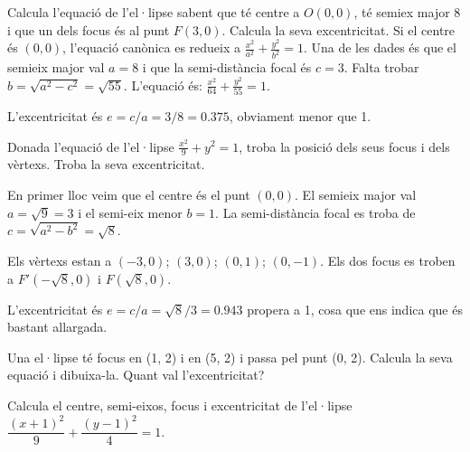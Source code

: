 \documentclass[11pt, a4paper, pdf]{article}
\begin{document}
\begin{resolt}[E]{Calcula l'equació de l'el·lipse sabent que té centre a $O(0,0)$, té semiex major 8 i que un dels focus és al punt $F(3,0)$. Calcula la seva excentricitat. }
	Si el centre és $(0,0)$, l'equació canònica es redueix a $\frac{x^2}{a^2}+\frac{y^2}{b^2}=1$. Una de les dades és que el semieix major val $a=8$ i que la semi-distància focal és $c=3$. Falta trobar $b=\sqrt{a^2-c^2}=\sqrt{55}$. L'equació és: $\frac{x^2}{64}+\frac{y^2}{55}=1$.
	
	L'excentricitat és $e=c/a = 3/8 = 0.375 $, obviament menor que 1.
	
\end{resolt}
\vspace{-0.75cm}
\begin{resolt}{Donada l'equació de l'el·lipse  $\frac{x^2}{9}+y^2=1$, troba la posició dels seus focus i dels vèrtexs. Troba la seva excentricitat. }
	
	
	En primer lloc veim que el centre és el punt $(0,0)$. El semieix major val $a=\sqrt{9}=3$ i el semi-eix menor $b=1$. La semi-distància focal es troba de $c=\sqrt{a^2-b^2}=\sqrt{8}$. 
	
	Els vèrtexs estan a $(-3,0)$; $(3,0)$; $(0,1)$; $(0,-1)$. Els dos focus es troben a $F'(-\sqrt{8},0)$ i $F(\sqrt{8},0)$.  
	
	L'excentricitat és $e=c/a = \sqrt{8}/3 = 0.943$ propera a 1, cosa que ens indica que és bastant allargada.
	
\end{resolt}

\begin{mylist}
	\item Una el·lipse té focus en (1, 2) i en (5, 2) i passa pel punt (0, 2). Calcula la seva equació i dibuixa-la. Quant val l'excentricitat?
	
	\item Calcula el centre, semi-eixos, focus i excentricitat de l'el·lipse  $\dfrac{\left(x+1\right)^{2} }{9} +\dfrac{\left(y-1\right)^{2} }{4} =1$.
\end{mylist}
\newpage
\end{document}
